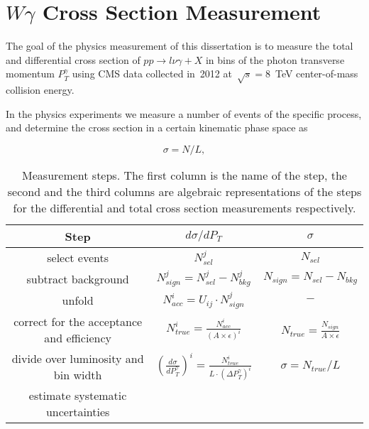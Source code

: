 \chapter{$W\gamma$ Cross Section Measurement}
\label{sec:AN_WgMeas}

The goal of the physics measurement of this dissertation is to measure the total and differential cross section of $pp \rightarrow l\nu\gamma + X$ in bins of the photon transverse momentum $P_T^\gamma$ using CMS data collected in~2012 at~$\sqrt{s}=8$~TeV center-of-mass collision energy. 

In the physics experiments we measure a number of events of the specific process, and determine the cross section in a certain kinematic phase space as

\begin{equation}
  \sigma = N/L,
\end{equation}

\begin{table}[h]
  \small
  \begin{center}
  \caption{Measurement steps. The first column is the name of the step, the second and the third columns are algebraic representations of the steps for the differential and total cross section measurements respectively. }
  \begin{tabular}{|c|c|c|}
    \hline
    Step & $d\sigma/dP_{T}$ & $\sigma$ \\ \hline
    select events & $N_{sel}^j$ &    $N_{sel}$       \\ \hline
    subtract background & $N_{sign}^j = N_{sel}^j - N_{bkg}^j$ &    $N_{sign}=N_{sel}-N_{bkg}$       \\ \hline
    unfold   & $N_{acc}^i = U_{ij} \cdot N_{sign}^j$ &    $-$       \\ \hline
    correct for the acceptance and efficiency & $N_{true}^i = \frac{N_{acc}^i}{(A \times\epsilon)^i}$ &  $N_{true}=\frac{N_{sign}}{A\times\epsilon}$       \\ \hline
    divide over luminosity and bin width & $ \left( \frac{d\sigma}{dP_{T}^\gamma} \right) ^i = \frac{N_{true}^i}{L \cdot (\Delta P_T^\gamma)^i}$  &  $\sigma = N_{true}/L$       \\ \hline
    estimate systematic uncertainties &  &         \\ \hline
  \end{tabular}
  \label{tab:analysisOutline}
  \end{center}
\end{table}

